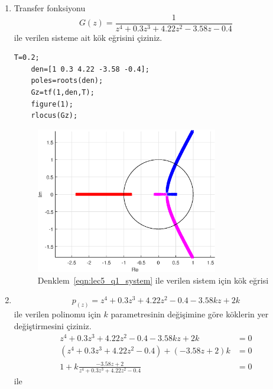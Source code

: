 \begin{enumerate}
    \item Transfer fonksiyonu
    \begin{equation}
        G(z)=\frac{1}{z^4+0.3z^3+4.22z^2-3.58z-0.4}\label{eqn:lec5_q1_system}
    \end{equation}
    ile verilen sisteme ait kök eğrisini çiziniz.
    \begin{lstlisting}[style=Matlab-editor]
    T=0.2;
    den=[1 0.3 4.22 -3.58 -0.4];
    poles=roots(den);
    Gz=tf(1,den,T);
    figure(1);
    rlocus(Gz);
    \end{lstlisting}
    \begin{figure}[!htb]
        \centering
        \includegraphics[width=0.75\textwidth]{img/lec5_rlocus1}
        \caption{Denklem~\ref{eqn:lec5_q1_system} ile verilen sistem için kök eğrisi}
        \label{fig:lec5_rlocus1}
    \end{figure}
    \item 
    \begin{equation}
        p_(z)=z^4+0.3z^3+4.22z^2-0.4-3.58kz+2k\label{eqn:lec5_q2_polinom}
    \end{equation}
    ile verilen polinomu için $k$ parametresinin değişimine göre köklerin yer değiştirmesini çiziniz.
    \begin{equation}
    \begin{split}
        z^4+0.3z^3+4.22z^2-0.4-3.58kz+2k&=0\\
        (z^4+0.3z^3+4.22z^2-0.4)+(-3.58z+2)k&=0\\
        1+k\frac{-3.58z+2}{z^4+0.3z^3+4.22z^2-0.4}&=0
    \end{split}
    \end{equation}
    ile
    \begin{equation}

\end{equation}
\end{enumerate}

